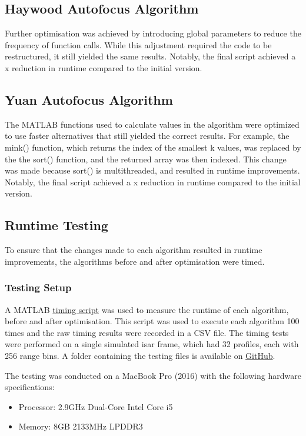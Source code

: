 \documentclass[class=report,11pt,crop=false]{standalone}
\begin{document}
    \subsection{Haywood Autofocus Algorithm}
    Further optimisation was achieved by introducing global parameters to reduce the frequency of function calls. While this adjustment required the code to be restructured, it still yielded the same results. Notably, the final script achieved a x reduction in runtime compared to the initial version.

    \subsection{Yuan Autofocus Algorithm}
    The \textsc{MATLAB} functions used to calculate values in the algorithm were optimized to use faster alternatives that still yielded the correct results. For example, the mink() function, which returns the index of the smallest k values, was replaced by the the sort() function, and the returned array was then indexed. This change was made because sort() is multithreaded, and resulted in runtime improvements. Notably, the final script achieved a x reduction in runtime compared to the initial version.
    \subsection{Runtime Testing}
    To ensure that the changes made to each algorithm resulted in runtime improvements, the algorithms before and after optimisation were timed.
    \subsubsection{Testing Setup}
    A \textsc{MATLAB} \href{}{timing script} was used to measure the runtime of each algorithm, before and after optimisation. This script was used to execute each algorithm 100 times and the raw timing results were recorded in a CSV file. The timing tests were performed on a single simulated \gls{isar} frame,  which had 32 profiles, each with 256 range bins. A folder containing the testing files is available on \href{}{GitHub}.

    The testing was conducted on a MacBook Pro (2016) with the following hardware specifications:
    \begin{itemize}
        \item Processor: 2.9GHz Dual-Core Intel Core i5
        \item Memory: 8GB 2133MHz LPDDR3
    \end{itemize}
\end{document}
